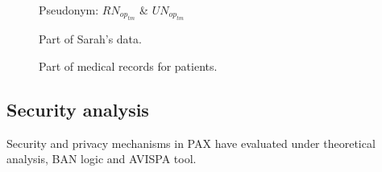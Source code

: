 \documentclass[journal,article,submit,moreauthors,pdftex]{Definitions/mdpi}
\begin{document}
\begin{figure}[!t]
     \scriptsize
\begin{minipage}[t]{0.38\textwidth}
\begin{tcolorbox}[
  colback=white, %
  colframe=black, %
  boxrule=0.8pt,
  arc=0.0mm,
  ]
 Pseudonym: $RN_{op_{tm}}$ \& $UN_{op_{tm}}$
 \end{tcolorbox}
  \caption{Part of Sarah's data.}
  \label{fig:saradata}
\end{minipage}\hfill
     \scriptsize
   \begin {minipage}[t]{0.47\textwidth}
     \begin{tcolorbox}[%
  colback=white, %
  colframe=black, %
  boxrule=0.8pt,
  arc=0.0mm,
  ]

 \end{tcolorbox}

     \caption{Part of medical records for patients.}
     \label{fig:patientsdata}
   \end{minipage}
\end{figure}
\subsection{Security analysis}
Security and privacy mechanisms in PAX have evaluated under theoretical analysis, BAN logic and AVISPA tool.
\end{document}
